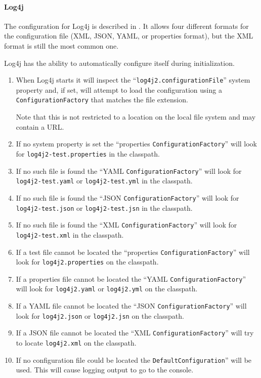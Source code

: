 \documentclass[11pt,a4paper, titlepage, parskip=half, headsepline, footsepline, cleardoublepage=current, headheight=1cm]{scrbook}
\begin{document}
\paragraph{Log4j} The configuration for Log4j is described in \autocite{APACHE_LOG4J:Configuration}. It allows four different formats for the configuration file (XML, JSON, YAML, or properties format), but the XML format is still the most common one.

Log4j has the ability to automatically configure itself during initialization. 
\begin{enumerate}
\item{When Log4j starts it will inspect the “\verb#log4j2.configurationFile#” system property and, if set, will attempt to load the configuration using a \lstinline|ConfigurationFactory| that matches the file extension.

Note that this is not restricted to a location on the local file system and may contain a URL.}
\item{If no system property is set the “properties \lstinline|ConfigurationFactory|” will look for \verb#log4j2-test.properties# in the classpath.}
\item{If no such file is found the “YAML \lstinline|ConfigurationFactory|” will look for \verb#log4j2-test.yaml# or \verb#log4j2-test.yml# in the classpath.}
\item{If no such file is found the “JSON \lstinline|ConfigurationFactory|” will look for \verb#log4j2-test.json# or \verb#log4j2-test.jsn# in the classpath.}
\item{If no such file is found the “XML \lstinline|ConfigurationFactory|” will look for \verb#log4j2-test.xml# in the classpath.}
\item{If a test file cannot be located the “properties \lstinline|ConfigurationFactory|” will look for \verb#log4j2.properties# on the classpath.}
\item{If a properties file cannot be located the “YAML \lstinline|ConfigurationFactory|” will look for \verb#log4j2.yaml# or \verb#log4j2.yml# on the classpath.}
\item{If a YAML file cannot be located the “JSON \lstinline|ConfigurationFactory|” will look for \verb#log4j2.json# or \verb#log4j2.jsn# on the classpath.}
\item{If a JSON file cannot be located the “XML \lstinline|ConfigurationFactory|” will try to locate \verb#log4j2.xml# on the classpath.}
\item{If no configuration file could be located the \lstinline|DefaultConfiguration|” will be used. This will cause logging output to go to the console.}
\end{enumerate}
\end{document}
